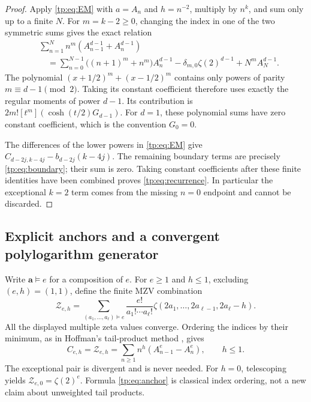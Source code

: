 \documentclass[11pt,a4paper]{article}
\numberwithin{equation}{section}
\theoremstyle{definition}
\theoremstyle{remark}
\begin{document}
\begin{proof}
Apply \eqref{tp:eq:EM} with $a=A_n$ and $h=n^{-2}$, multiply by
$n^k$, and sum only up to a finite $N$.  For $m=k-2\geq0$, changing
the index in one of the two symmetric sums gives the exact relation
\begin{align*}
 &\sum_{n=1}^N n^m(A_{n-1}^{d-1}+A_n^{d-1})\\
 &\quad=\sum_{n=0}^{N-1}\bigl((n+1)^m+n^m\bigr)A_n^{d-1}
       -\delta_{m,0}\zeta(2)^{d-1}+N^mA_N^{d-1}.
\end{align*}
The polynomial $(x+1/2)^m+(x-1/2)^m$ contains only powers of
parity $m\equiv d-1\pmod2$.  Taking its constant coefficient therefore
uses exactly the regular moments of power $d-1$.  Its contribution is
$2m![t^m](\cosh(t/2)G_{d-1})$.  For $d=1$, these polynomial sums have
zero constant coefficient, which is the convention $G_0=0$.

The differences of the lower powers in \eqref{tp:eq:EM} give
$C_{d-2j,k-4j}-b_{d-2j}(k-4j)$.  The remaining boundary terms are
precisely \eqref{tp:eq:boundary}; their sum is zero.  Taking constant
coefficients after these finite identities have been combined proves
\eqref{tp:eq:recurrence}.  In particular the exceptional $k=2$ term
comes from the missing $n=0$ endpoint and cannot be discarded.
\end{proof}

\subsection{Explicit anchors and a convergent polylogarithm generator}

Write $\boldsymbol a\vDash e$ for a composition of $e$.  For $e\geq1$
and $h\leq1$, excluding $(e,h)=(1,1)$, define the finite MZV combination
\begin{equation}\label{tp:eq:anchor}
 \mathcal Z_{e,h}=
 \sum_{(a_1,\ldots,a_\ell)\vDash e}
 \frac{e!}{a_1!\cdots a_\ell!}
 \zeta(2a_1,\ldots,2a_{\ell-1},2a_\ell-h).
\end{equation}
All the displayed multiple zeta values converge.  Ordering the indices
by their minimum, as in Hoffman's tail-product method \cite{HoffmanTails},
gives
\begin{equation}\label{tp:eq:anchorseries}
 C_{e,h}=\mathcal Z_{e,h}
 =\sum_{n\geq1}n^h(A_{n-1}^e-A_n^e),\qquad h\leq1.
\end{equation}
The exceptional pair is divergent and is never needed.  For $h=0$,
telescoping yields $\mathcal Z_{e,0}=\zeta(2)^e$.  Formula
\eqref{tp:eq:anchor} is classical index ordering, not a new claim about
unweighted tail products.
\end{document}
